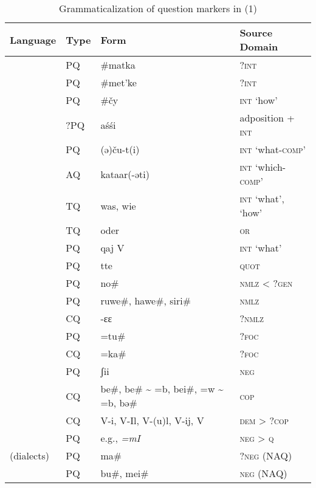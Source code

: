 \begin{table}
\caption{Grammaticalization of question markers in  (1)}
\label{tab:6:2}

\begin{tabularx}{\textwidth}{llQl}
\lsptoprule

\textbf{Language} & \textbf{Type} & \textbf{Form} & \textbf{Source Domain}\\
\midrule
{} & PQ & \#matka & ?\textsc{int}\\
 & PQ & \#met’ke & ?\textsc{int}\\
 & PQ & \#čy & \textsc{int} ‘how’\\
 & ?PQ & aśśi & adposition + \textsc{int}\\
 & PQ & (ə)ču-t(i) & \textsc{int} ‘what-\textsc{comp}’\\
& AQ & kataar(-əti) & \textsc{int} ‘which-\textsc{comp}’\\
 & TQ & was, wie & \textsc{int} ‘what’, ‘how’\\
& TQ & oder & \textsc{or}\\
 & PQ & qaj V & \textsc{int} ‘what’\\
 & PQ & tte & \textsc{quot}\\
& PQ & no\textsc{\#} & \textsc{nmlz < ?gen}\\
 & PQ & ruwe\textsc{\#}, hawe\textsc{\#}, siri\textsc{\#} & \textsc{nmlz}\\
 & CQ & {}-ɛɛ & ?\textsc{nmlz}\\
& PQ & =tu\# & \textsc{?foc}\\
& CQ & =ka\# & \textsc{?foc}\\
 & PQ & ʃii & \textsc{neg}\\
 & CQ &  be\#,  be\# {\textasciitilde} =b,  bei\#,  =w {\textasciitilde} =b,  bə\# & \textsc{cop}\\
 & CQ &  V-i,  V-Il,  V-(u)l,  V-ij,  V & \textsc{dem} > ?\textsc{cop}\\
 & PQ & e.g.,  \textit{=mI} & \textsc{neg} > \textsc{q}\\
 (dialects) & PQ & ma\# & ?\textsc{neg} (NAQ)\\
& PQ & bu\#, mei\# & \textsc{neg} (NAQ)\\

\end{tabularx}
\end{table}
